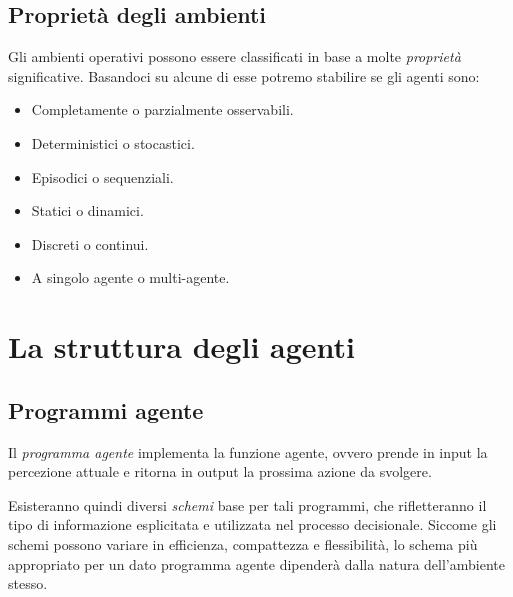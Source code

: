 \documentclass[11pt,oneside]{book}
\begin{document}
\subsection{Proprietà degli ambienti}
Gli ambienti operativi possono essere classificati in base a molte \textit{proprietà} significative. Basandoci su alcune di esse potremo stabilire se gli agenti sono:
\begin{itemize}
	\item Completamente o parzialmente osservabili.
	\item Deterministici o stocastici.
	\item Episodici o sequenziali.
	\item Statici o dinamici.
	\item Discreti o continui.
	\item A singolo agente o multi-agente.
\end{itemize}

\section{La struttura degli agenti}
\subsection{Programmi agente}
Il \textit{programma agente} implementa la funzione agente, ovvero prende in input la percezione attuale e ritorna in output la prossima azione da svolgere.

Esisteranno quindi diversi \textit{schemi} base per tali programmi, che rifletteranno il tipo di informazione esplicitata e utilizzata nel processo decisionale. Siccome gli schemi possono variare in efficienza, compattezza e flessibilità, lo schema più appropriato per un dato programma agente dipenderà dalla natura dell'ambiente stesso.
\end{document}
